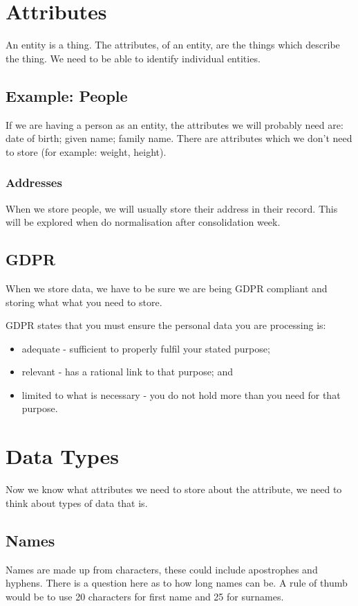 
\section*{Attributes}
An entity is a thing. The attributes, of an entity, are the things which describe the thing. We need to be able to identify individual entities.
\subsection*{Example: People}
If we are having a person as an entity, the attributes we will probably need are: date of birth; given name; family name. There are attributes which we don't need to store (for example: weight, height).
\subsubsection*{Addresses}
When we store people, we will usually store their address in their record. This will be explored when do normalisation after consolidation week.

\subsection*{GDPR}
When we store data, we have to be sure we are being GDPR compliant and storing what what you need to store.

GDPR states that you must ensure the personal data you are processing is:
\begin{itemize}
    \item adequate - sufficient to properly fulfil your stated purpose;
    \item relevant - has a rational link to that purpose; and
    \item limited to what is necessary - you do not hold more than you need for that purpose.
\end{itemize}

\section*{Data Types}
Now we know what attributes we need to store about the attribute, we need to think about types of data that is. 
\subsection*{Names}
Names are made up from characters, these could include apostrophes and hyphens. There is a question here as to how long names can be. A rule of thumb would be to use 20 characters for first name and 25 for surnames.
